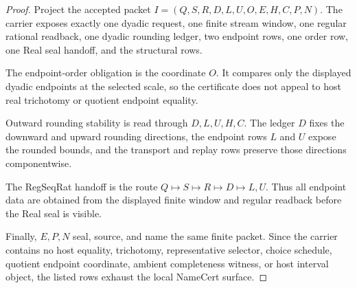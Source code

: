 \begin{proof}
Project the accepted packet $I=(Q,S,R,D,L,U,O,E,H,C,P,N)$. The carrier exposes exactly one dyadic request, one finite stream window, one regular rational readback, one dyadic rounding ledger, two endpoint rows, one order row, one Real seal handoff, and the structural rows.

The endpoint-order obligation is the coordinate $O$. It compares only the displayed dyadic endpoints at the selected scale, so the certificate does not appeal to host real trichotomy or quotient endpoint equality.

Outward rounding stability is read through $D,L,U,H,C$. The ledger $D$ fixes the downward and upward rounding directions, the endpoint rows $L$ and $U$ expose the rounded bounds, and the transport and replay rows preserve those directions componentwise.

The RegSeqRat handoff is the route $Q\longmapsto S\longmapsto R\longmapsto D\longmapsto L,U$. Thus all endpoint data are obtained from the displayed finite window and regular readback before the Real seal is visible.

Finally, $E,P,N$ seal, source, and name the same finite packet. Since the carrier contains no host equality, trichotomy, representative selector, choice schedule, quotient endpoint coordinate, ambient completeness witness, or host interval object, the listed rows exhaust the local NameCert surface.
\end{proof}

